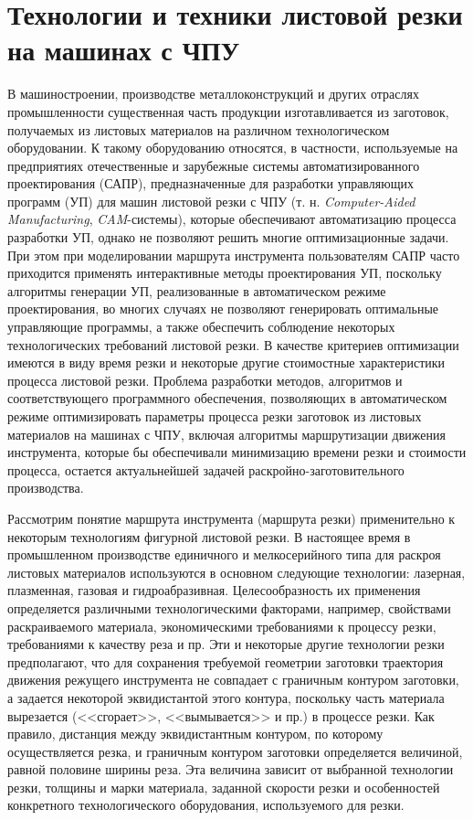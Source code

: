 \documentclass[11pt,twoside,openany]{report}
\begin{document}
{\raggedright\section{
  Технологии и техники листовой резки на машинах с ЧПУ
}}
\label{sect:1.1}
\setcounter{equation}{0}

В машиностроении,
производстве металлоконструкций
и других отраслях промышленности существенная часть продукции
изготавливается из заготовок,
получаемых из листовых материалов на различном технологическом оборудовании.
К такому оборудованию относятся, в частности,
используемые на предприятиях отечественные и зарубежные
системы автоматизированного проектирования (САПР),
предназначенные для разработки управляющих программ (УП)
для машин листовой резки с ЧПУ
(т. н. \textit{Computer-Aided Manufacturing},
\textit{CAM}-системы),
которые
обеспечивают автоматизацию процесса разработки УП,
однако не позволяют решить многие оптимизационные задачи.
При этом при моделировании маршрута инструмента пользователям
САПР часто приходится применять интерактивные методы проектирования УП,
поскольку алгоритмы генерации УП,
реализованные в автоматическом режиме проектирования,
во многих случаях не позволяют генерировать оптимальные управляющие программы,
а также обеспечить соблюдение некоторых технологических требований листовой резки.
В качестве критериев оптимизации имеются в виду время резки и
некоторые другие стоимостные характеристики процесса листовой резки.
Проблема разработки методов, алгоритмов и соответствующего программного обеспечения,
позволяющих в автоматическом режиме оптимизировать параметры
процесса резки заготовок из листовых материалов на машинах с ЧПУ,
включая алгоритмы маршрутизации движения инструмента,
которые бы обеспечивали минимизацию времени резки и стоимости процесса,
остается актуальнейшей задачей раскройно-заготовительного производства.

Рассмотрим понятие маршрута инструмента (маршрута резки)
применительно к некоторым технологиям фигурной листовой резки.
В настоящее время в промышленном производстве
единичного и мелкосерийного типа для раскроя листовых материалов
используются в основном следующие технологии:
лазерная, плазменная, газовая и гидроабразивная.
Целесообразность их применения определяется различными технологическими факторами,
например, свойствами раскраиваемого материала,
экономическими требованиями к процессу резки,
требованиями к качеству реза и пр.
Эти и некоторые другие технологии резки предполагают,
что для сохранения требуемой геометрии заготовки
траектория движения режущего инструмента не совпадает
с граничным контуром заготовки,
а задается некоторой эквидистантой этого контура,
поскольку часть материала вырезается (<<сгорает>>, <<вымывается>> и пр.)
в процессе резки.
Как правило, дистанция между эквидистантным контуром,
по которому осуществляется резка, и граничным контуром заготовки определяется величиной,
равной половине ширины реза.
Эта величина зависит от выбранной технологии резки,
толщины и марки материала, заданной скорости резки
и особенностей конкретного технологического оборудования,
используемого для резки.
\end{document}
